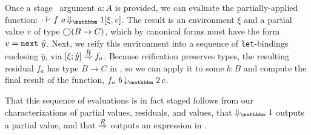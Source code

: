 Once a stage \bbone\ argument $a:A$ is provided, we can evaluate the partially-applied
function:
$\cdot\vdash f~a \mathop{\redonesym} [\xi,v]$.
The result is an environment $\xi$ and a partial value $v$ of type $\bigcirc(B\to
C)$, which by canonical forms must have the form $v = {\tt next}~\hat y$. 
Next, we reify this environment into a sequence of \verb|let|-bindings
enclosing $\hat y$, via $[{\xi};{\hat y}]\overset{R}\Rightarrow{f_a}$. 
Because reification preserves types, the resulting residual $f_a$ has type $B\to C$ in \langTwo, so we can apply it to some $b:B$
and compute the final result of the function, $f_a~b \mathop{\tworedsym} c$.

That this sequence of evaluations is in fact staged follows from our
characterizations of partial values, residuals, and values, that $\redonesym$
outputs a partial value, and that $\overset{R}\Rightarrow$ outputs an expression in \langTwo.


